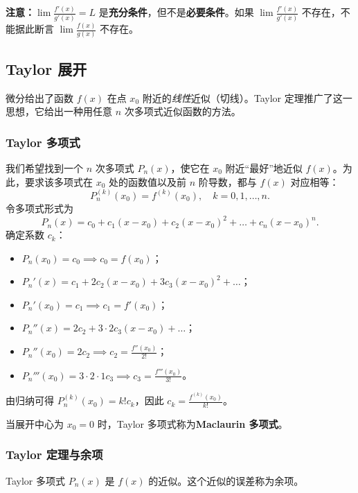 \begin{remark}
\textbf{注意：}$\lim \frac{f'(x)}{g'(x)}=L$ 是\textbf{充分条件}，但不是\textbf{必要条件}。如果 $\lim \frac{f'(x)}{g'(x)}$ 不存在，不能据此断言 $\lim \frac{f(x)}{g(x)}$ 不存在。
\end{remark}

\subsection{Taylor 展开}

微分给出了函数 $f(x)$ 在点 $x_0$ 附近的\textit{线性}近似（切线）。Taylor 定理推广了这一思想，它给出一种用任意 $n$ 次多项式近似函数的方法。

\subsubsection{Taylor 多项式}

我们希望找到一个 $n$ 次多项式 $P_n(x)$，使它在 $x_0$ 附近“最好”地近似 $f(x)$。为此，要求该多项式在 $x_0$ 处的函数值以及前 $n$ 阶导数，都与 $f(x)$ 对应相等：
\[
P_n^{(k)}(x_0)=f^{(k)}(x_0),\quad k=0,1,\dots,n.
\]
令多项式形式为
\[
P_n(x)=c_0+c_1(x-x_0)+c_2(x-x_0)^2+\dots+c_n(x-x_0)^n.
\]
确定系数 $c_k$：
\begin{itemize}
    \item $P_n(x_0)=c_0\implies c_0=f(x_0)$；
    \item $P_n'(x)=c_1+2c_2(x-x_0)+3c_3(x-x_0)^2+\dots$；
    \item $P_n'(x_0)=c_1\implies c_1=f'(x_0)$；
    \item $P_n''(x)=2c_2+3\cdot 2c_3(x-x_0)+\dots$；
    \item $P_n''(x_0)=2c_2\implies c_2=\frac{f''(x_0)}{2!}$；
    \item $P_n'''(x_0)=3\cdot 2\cdot 1c_3\implies c_3=\frac{f'''(x_0)}{3!}$。
\end{itemize}
由归纳可得 $P_n^{(k)}(x_0)=k!c_k$，因此 $c_k=\frac{f^{(k)}(x_0)}{k!}$。

\begin{definition}
当展开中心为 $x_0=0$ 时，Taylor 多项式称为\textbf{Maclaurin 多项式}。
\end{definition}

\subsubsection{Taylor 定理与余项}

Taylor 多项式 $P_n(x)$ 是 $f(x)$ 的近似。这个近似的误差称为余项。

